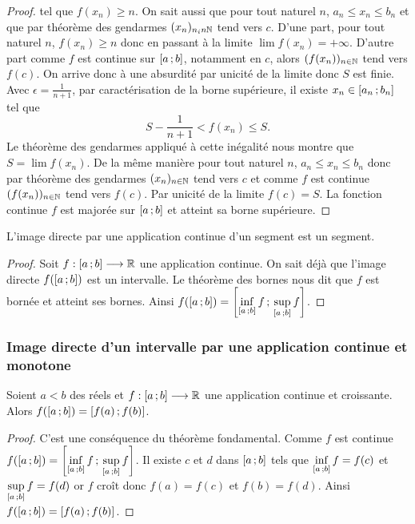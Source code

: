 \begin{proof}
  \) tel que \(f(x_n) \geqslant n\). On sait aussi que
  pour tout naturel \(n\), \(a_n \leqslant x_n \leqslant b_n\) et que par
  théorème des gendarmes \((x_n)_{n _in \mathbb{N}}\) tend vers \(c\). D'une part, pour
  tout naturel \(n\), \(f(x_n) \geqslant n\) donc en passant à la limite \(\lim
  f(x_n) = +\infty\). D'autre part comme \(f\) est continue sur
  \(\left[ a \, ; {} b \right]\), notamment en \(c\), alors \((f(x_n))_{n\in \mathbb{N}}\) tend
  vers \(f(c)\). On arrive donc à une absurdité par unicité de la limite donc
  \(S\) est finie. Avec \(\epsilon=\frac{1}{n+1}\), par caractérisation de la
  borne supérieure, il existe \(x_n \in \left[ a_n \, ; {} b_n \right]\) tel que
  \begin{equation}
    S-\frac{1}{n+1} < f(x_n) \leqslant S.
  \end{equation}
  Le théorème des gendarmes appliqué à cette inégalité nous montre que \(S=\lim
  f(x_n)\). De la même manière pour tout naturel \(n\), \(a_n \leqslant x_n
  \leqslant b_n\) donc par théorème des gendarmes \((x_n)_{n\in \mathbb{N}}\) tend vers
  \(c\) et comme \(f\) est continue \((f(x_n))_{n\in \mathbb{N}}\) tend vers \(f(c)\).
  Par unicité de la limite \(f(c)=S\). La fonction continue \(f\) est majorée
  sur \(\left[ a \, ; {} b \right]\) et atteint sa borne supérieure.
\end{proof}

\begin{theo}
  L'image directe par une application continue d'un segment est un segment.
\end{theo}
\begin{proof}
  Soit \(f:\left[ a \, ; {} b \right] \longrightarrow \mathbb{R}\) une application continue. On
  sait déjà que l'image directe \(f(\left[ a \, ; {} b \right])\) est un intervalle. Le
  théorème des bornes nous dit que \(f\) est bornée et atteint ses bornes. Ainsi
  \(f(\left[ a \, ; {} b \right])=\left[ \inf\limits_{\left[ a \, ; {} b \right]}f \, ; {} \sup\limits_{\left[ a \, ; {} b \right]}f \right]\).
\end{proof}

\subsubsection[Image directe d'un intervalle]{Image directe d'un intervalle par
une application continue et monotone}

\begin{theo} \label{theo:imagesegment}
  Soient \(a<b\) des réels et \(f:\left[ a \, ; {} b \right] \longrightarrow \mathbb{R}\) une
  application continue et croissante. Alors
  \(f(\left[ a \, ; {} b \right])=\left[ f(a) \, ; {} f(b) \right]\).
\end{theo}
\begin{proof}
  C'est une conséquence du théorème fondamental. Comme \(f\) est continue
  \(f(\left[ a \, ; {} b \right])=\left[ \inf\limits_{\left[ a \, ; {} b \right]}f \, ; {} \sup\limits_{\left[ a \, ; {} b \right]}f \right]\).
  Il existe \(c\) et \(d\) dans \(\left[ a \, ; {} b \right]\) tels que
  \(\inf\limits_{\left[ a \, ; {} b \right]}f=f(c)\) et
  \(\sup\limits_{\left[ a \, ; {} b \right]}f=f(d)\) or \(f\) croît donc \(f(a)=f(c)\)
  et \(f(b)=f(d)\). Ainsi \(f(\left[ a \, ; {} b \right])=\left[ f(a) \, ; {} f(b) \right]\).
\end{proof}

